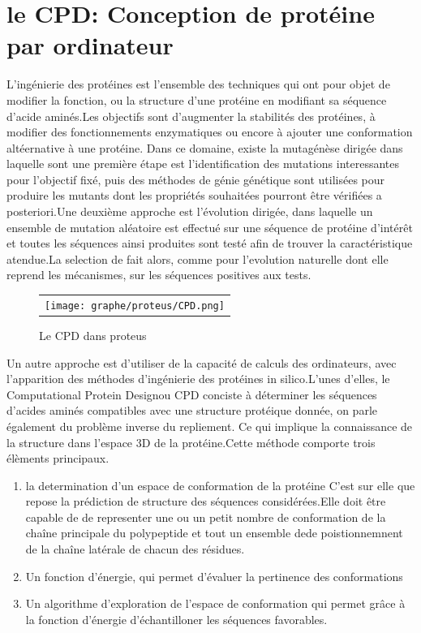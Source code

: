 
\chapter{le \og CPD\fg: Conception de protéine par ordinateur}
\label{chap:CPD}

L'ingénierie des protéines est l'ensemble des techniques qui ont pour objet de modifier la fonction, ou la structure d'une protéine en modifiant sa séquence d'acide aminés.Les objectifs sont d'augmenter la stabilités des protéines, à modifier des fonctionnements enzymatiques ou encore à ajouter une conformation altéernative à une protéine.
Dans ce domaine, existe la mutagénèse dirigée dans laquelle sont une première étape est l'identification des mutations interessantes pour l'objectif fixé, puis des méthodes de génie génétique sont utilisées pour produire les mutants dont les propriétés souhaitées pourront être vérifiées a posteriori.Une deuxième approche est l'évolution dirigée, dans laquelle un ensemble de mutation aléatoire est effectué sur une séquence de protéine d'intérêt et toutes les séquences ainsi produites sont testé afin de trouver la caractéristique atendue.La selection de fait alors, comme pour l'evolution naturelle dont elle reprend les mécanismes, sur les séquences positives aux tests.


   \begin{figure}[t]
     \centering
     \begin{tabular}{c}
       \texttt{[image: graphe/proteus/CPD.png]} &
     \end{tabular}
     
     \caption{Le CPD dans proteus}
\label{graph:struct_Phy}
   \end{figure}


Un autre approche est d'utiliser de la capacité de calculs des ordinateurs, avec l'apparition des méthodes d'ingénierie des protéines \og in silico\fg.L'unes d'elles, le \og Computational Protein Design\fg ou CPD conciste à déterminer les séquences d'acides aminés compatibles avec une structure protéique donnée, on parle également du problème inverse du repliement. Ce qui implique la connaissance de la structure dans l'espace 3D de la protéine.Cette méthode comporte trois élèments principaux.

\begin{enumerate}
\item la determination d'un espace de conformation de la protéine
  C'est sur elle que repose la prédiction de structure des séquences considérées.Elle doit être capable de de representer une ou un petit nombre de conformation de la chaîne principale du polypeptide et tout un ensemble dede poistionnemnent de la chaîne latérale de chacun des résidues.
\item Un fonction d'énergie, qui permet d'évaluer la pertinence des conformations 
\item Un algorithme d'exploration de l'espace de conformation qui permet grâce à la fonction d'énergie d'échantilloner les séquences favorables.
  
\end{enumerate}

